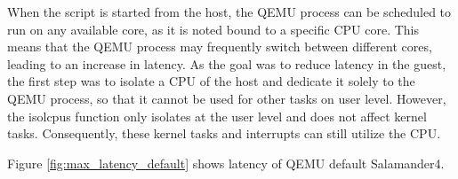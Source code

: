 \documentclass[MMR,Master,english]{twbook}
\begin{document}
 
\clearpage
\noindent When the script is started from the host, the QEMU process can be scheduled to run on any available core, as it is noted bound to a specific CPU core. This means that the QEMU process may frequently switch between different cores, leading to an increase in latency. As the goal was to reduce latency in the guest, the first step was to isolate a CPU of the host and dedicate it solely to the QEMU process, so that it cannot be used for other tasks on user level. However, the isolcpus function only isolates at the user level and does not affect kernel tasks. Consequently, these kernel tasks and interrupts can still utilize the CPU.


Figure \ref{fig:max_latency_default} shows latency of QEMU default Salamander4.
 
\end{document}
